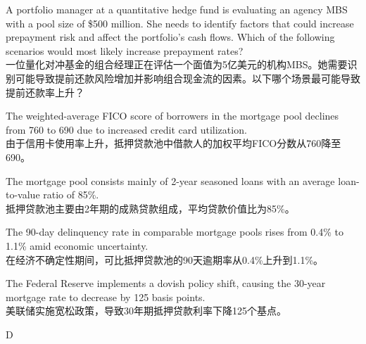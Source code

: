 \documentclass{article}
\newcounter{question} %
\begin{document}
    \begin{question}
        A portfolio manager at a quantitative hedge fund is evaluating an agency MBS with a pool size of \$500 million. She needs to identify factors that could increase prepayment risk and affect the portfolio's cash flows. Which of the following scenarios would most likely increase prepayment rates?\\
        一位量化对冲基金的组合经理正在评估一个面值为5亿美元的机构MBS。她需要识别可能导致提前还款风险增加并影响组合现金流的因素。以下哪个场景最可能导致提前还款率上升？
    \end{question}
        
        \begin{choices}
            \item The weighted-average FICO score of borrowers in the mortgage pool declines from 760 to 690 due to increased credit card utilization.\\
            由于信用卡使用率上升，抵押贷款池中借款人的加权平均FICO分数从760降至690。
            
            \item The mortgage pool consists mainly of 2-year seasoned loans with an average loan-to-value ratio of 85\%.\\
            抵押贷款池主要由2年期的成熟贷款组成，平均贷款价值比为85\%。
            
            \item The 90-day delinquency rate in comparable mortgage pools rises from 0.4\% to 1.1\% amid economic uncertainty.\\
            在经济不确定性期间，可比抵押贷款池的90天逾期率从0.4\%上升到1.1\%。
            
            \item The Federal Reserve implements a dovish policy shift, causing the 30-year mortgage rate to decrease by 125 basis points.\\
            美联储实施宽松政策，导致30年期抵押贷款利率下降125个基点。
        \end{choices}
        
        \begin{correctanswer}
        D
        \end{correctanswer}
        
\end{document}
